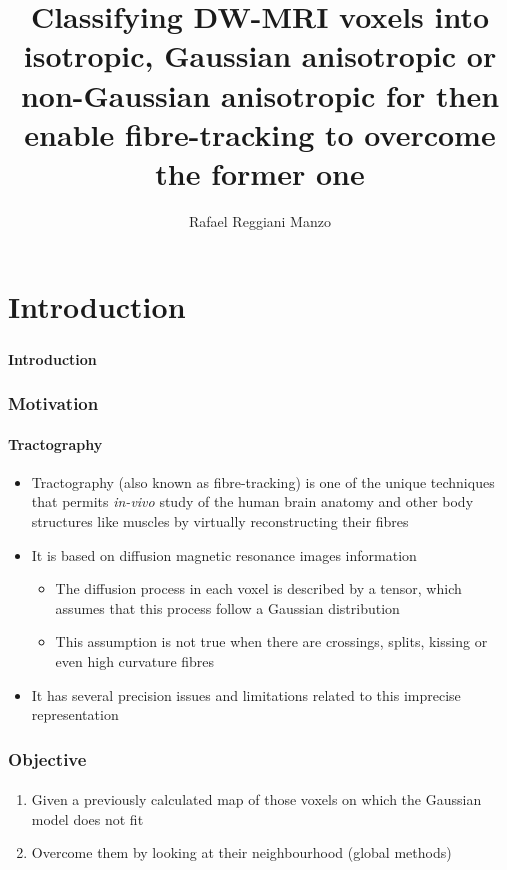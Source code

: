\documentclass[10pt]{beamer}
\title{Classifying DW-MRI voxels into isotropic, Gaussian anisotropic or non-Gaussian anisotropic for then enable fibre-tracking to overcome the former one}
\author{Rafael Reggiani Manzo}
\begin{document}
\maketitle

\section{Introduction}

\begin{frame}
  \frametitle{}
  \framesubtitle{}

  \begin{Large}
  \begin{center}
  \textbf{Introduction}
  \end{center}
  \end{Large}
\end{frame}

\begin{frame}
  \frametitle{Motivation}
  \framesubtitle{Tractography}

  \begin{itemize}
    \item Tractography (also known as fibre-tracking) is one of the unique techniques that permits \textit{in-vivo} study of the human brain anatomy and other body structures like muscles by virtually reconstructing their fibres
    \item It is based on diffusion magnetic resonance images information
      \begin{itemize}
        \item The diffusion process in each voxel is described by a tensor, which assumes that this process follow a Gaussian distribution
        \item This assumption is not true when there are crossings, splits, kissing or even high curvature fibres
      \end{itemize}
    \item It has several precision issues and limitations related to this imprecise representation
  \end{itemize}
\end{frame}

\begin{frame}
  \frametitle{Objective}
  \framesubtitle{}

  \begin{enumerate}
    \item Given a previously calculated map of those voxels on which the Gaussian model does not fit
    \item Overcome them by looking at their neighbourhood (global methods)
  \end{enumerate}
\end{frame}
\end{document}
